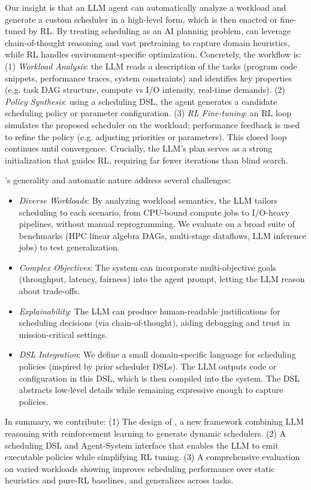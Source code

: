 Our insight is that an LLM agent can automatically analyze a workload and generate a custom scheduler in a high-level form, which is then enacted or fine-tuned by RL. By treating scheduling as an AI planning problem, \sys{} can leverage chain-of-thought reasoning and vast pretraining to capture domain heuristics, while RL handles environment-specific optimization. Concretely, the \sys{} workflow is: (1) \emph{Workload Analysis}: the LLM reads a description of the tasks (program code snippets, performance traces, system constraints) and identifies key properties (e.g. task DAG structure, compute vs I/O intensity, real-time demands). (2) \emph{Policy Synthesis}: using a scheduling DSL, the agent generates a candidate scheduling policy or parameter configuration. (3) \emph{RL Fine-tuning}: an RL loop simulates the proposed scheduler on the workload; performance feedback is used to refine the policy (e.g. adjusting priorities or parameters). This closed loop continues until convergence. Crucially, the LLM's plan serves as a strong initialization that guides RL, requiring far fewer iterations than blind search.

\sys{}'s generality and automatic nature address several challenges:

\begin{itemize}
\item \emph{Diverse Workloads}: By analyzing workload semantics, the LLM tailors scheduling to each scenario, from CPU-bound compute jobs to I/O-heavy pipelines, without manual reprogramming. We evaluate on a broad suite of benchmarks (HPC linear algebra DAGs, multi-stage dataflows, LLM inference jobs) to test generalization.
\item \emph{Complex Objectives}: The system can incorporate multi-objective goals (throughput, latency, fairness) into the agent prompt, letting the LLM reason about trade-offs.
\item \emph{Explainability}: The LLM can produce human-readable justifications for scheduling decisions (via chain-of-thought), aiding debugging and trust in mission-critical settings.
\item \emph{DSL Integration}: We define a small domain-specific language for scheduling policies (inspired by prior scheduler DSLs). The LLM outputs code or configuration in this DSL, which is then compiled into the system. The DSL abstracts low-level details while remaining expressive enough to capture policies.
\end{itemize}

In summary, we contribute: (1) The design of \emph{\sys{}}, a new framework combining LLM reasoning with reinforcement learning to generate dynamic schedulers. (2) A scheduling DSL and Agent-System interface that enables the LLM to emit executable policies while simplifying RL tuning. (3) A comprehensive evaluation on varied workloads showing \sys{} improves scheduling performance over static heuristics and pure-RL baselines, and generalizes across tasks.